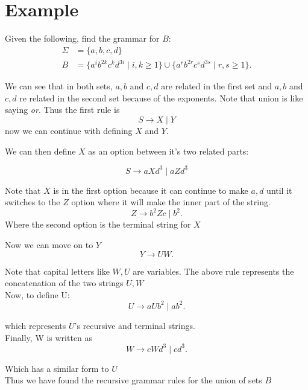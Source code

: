 \documentclass[12pt]{book}
\title{\coursetitle\linebreak\lecturename}
\author{\\Cain Susko\\ 
           \\ \\ \\
      Queen's University 
    \\School of Computing\\}
\begin{document}
\begin{titlepage}
        \maketitle
\end{titlepage}


\section*{Example}
Given the following, find the grammar for $B$:
 \begin{align*}
         \Sigma &= \{a,b,c,d\}\\
         B &= \{a^ib^{2k}c^kd^{3i} \mid i,k \geq 1\}\cup\{a^rb^{2r}c^sd^{3s} \mid r,s\geq 1\}
.\end{align*}

We can see that in both sets, $a,b$ and  $c,d$ are related in the first set and $a,b$ and $c,d$ re related in the second set
        because of the exponents.
Note that union is like saying \textit{or}. Thus the first rule is
\[S\to X \mid Y\]
now we can continue with defining $X$ and  $Y$.

We can then define $X$ as an option between it's two related parts:

\[S\to aXd^3 \mid aZd^3\]

Note that $X$ is in the first option because it can continue to make $a,d$ until it switches to the  $Z$ option where it will make
        the inner part of the string.
\[
Z\to b^2Zc \mid b^2
.\] 
Where the second option is the terminal string for $X$

Now we can move on to  $Y$
 \[
Y\to UW
.\] 

Note that capital letters like $W,U$ are variables. 
The above rule represents the concatenation of the two strings  $U,W$\\
Now, to define U\@:
 \[
U\to aUb^2  \mid ab^2
.\] 

which represents $U$'s recursive and terminal strings.\\
Finally, W is written as
 \[
W\to cWd^3  \mid cd^3
.\] 

Which has a similar form to $U$
\\

Thus we have found the recursive grammar rules for the union of sets $B$
\end{document}
